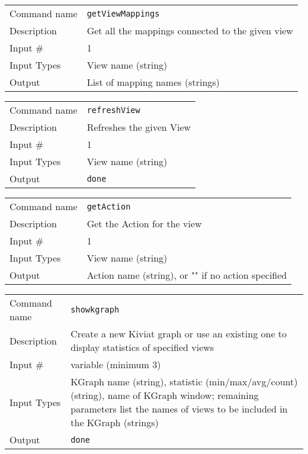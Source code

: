 \bigskip

\noindent
\begin{tabular}{l|p{5in}}
\hline
Command name & {\tt getViewMappings} \\
Description  & Get all the mappings connected to the given view \\
Input \#     & 1 \\
Input Types  & View name (string) \\
Output       & List of mapping names (strings) \\
\hline
\end{tabular}

\bigskip

\noindent
\begin{tabular}{l|p{5in}}
\hline
Command name & {\tt refreshView} \\
Description  & Refreshes the given View \\
Input \#     & 1 \\
Input Types  & View name (string) \\
Output       & {\tt done} \\
\hline
\end{tabular}

\bigskip

\noindent
\begin{tabular}{l|p{5in}}
\hline
Command name & {\tt getAction} \\
Description  & Get the Action for the view \\
Input \#     & 1 \\
Input Types  & View name (string) \\
Output       & Action name (string), or "" if no action specified \\
\hline
\end{tabular}

\bigskip

\noindent
\begin{tabular}{l|p{5in}}
\hline
Command name & {\tt showkgraph} \\
Description  & Create a new Kiviat graph or use an existing one to display
               statistics of specified views \\
Input \#     & variable (minimum 3) \\
Input Types  & KGraph name (string), statistic (min/max/avg/count) (string),
               name of KGraph window; remaining parameters list the names of
               views to be included in the KGraph (strings) \\
Output       & {\tt done} \\
\hline
\end{tabular}

